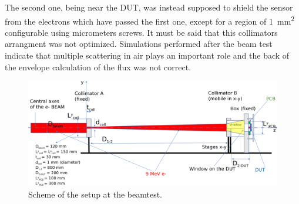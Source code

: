       The second one, being near the DUT, was instead supposed to shield the sensor from the electrons which have passed the first one, except for a region of \SI{1}{mm\squared} configurable using micrometers screws. 
      It must be said that this collimators arrangment was not optimized. Simulations performed after the beam test indicate that multiple scattering in air plays an important role and the back of the envelope calculation of the flux was not correct.    
      \begin{figure}
         \centering
         \includegraphics[width=\linewidth]{figures/test_beam/Flash-beam-scheme.pdf}
         \caption{Scheme of the setup at the beamtest. }
         \label{fig:test_beam_scheme}
      \end{figure} 
